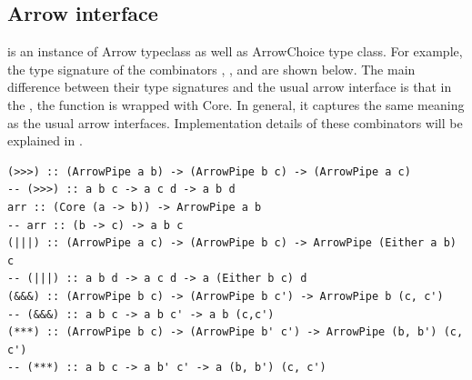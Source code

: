 \subsection{Arrow interface}
 is an instance of Arrow typeclass as well as ArrowChoice type class. For example, the type signature of the combinators \hask{>>>}, \hask{|||}, \hask{&&&} and  are shown below. The main difference between their type signatures and the usual arrow interface is that in the , the function is wrapped with Core. In general, it captures the same meaning as the usual arrow interfaces. Implementation details of these combinators will be explained in .
\begin{code}
\begin{verbatim}
(>>>) :: (ArrowPipe a b) -> (ArrowPipe b c) -> (ArrowPipe a c)
-- (>>>) :: a b c -> a c d -> a b d
arr :: (Core (a -> b)) -> ArrowPipe a b
-- arr :: (b -> c) -> a b c
(|||) :: (ArrowPipe a c) -> (ArrowPipe b c) -> ArrowPipe (Either a b) c
-- (|||) :: a b d -> a c d -> a (Either b c) d
(&&&) :: (ArrowPipe b c) -> (ArrowPipe b c') -> ArrowPipe b (c, c')
-- (&&&) :: a b c -> a b c' -> a b (c,c')
(***) :: (ArrowPipe b c) -> (ArrowPipe b' c') -> ArrowPipe (b, b') (c, c')
-- (***) :: a b c -> a b' c' -> a (b, b') (c, c')
\end{verbatim}
\end{code}
